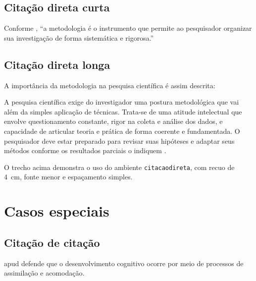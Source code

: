 \documentclass[a4paper, 12pt]{report}
\begin{document}
\section{Citação direta curta}

Conforme \textcite[p.~23]{severino2007}, ``a metodologia é o instrumento que
permite ao pesquisador organizar sua investigação de forma sistemática e
rigorosa.''

\section{Citação direta longa}

A importância da metodologia na pesquisa científica é assim descrita:

\begin{citacaodireta}
A pesquisa científica exige do investigador uma postura metodológica que vai
além da simples aplicação de técnicas. Trata-se de uma atitude intelectual
que envolve questionamento constante, rigor na coleta e análise dos dados,
e capacidade de articular teoria e prática de forma coerente e fundamentada.
O pesquisador deve estar preparado para revisar suas hipóteses e adaptar
seus métodos conforme os resultados parciais o indiquem
\parencite[p.~45--46]{severino2007}.
\end{citacaodireta}

O trecho acima demonstra o uso do ambiente \texttt{citacaodireta}, com recuo
de 4~cm, fonte menor e espaçamento simples.

\chapter{Casos especiais}

\section{Citação de citação}

\textcite{piaget1975} apud \textcite{moreira2011} defende que o
desenvolvimento cognitivo ocorre por meio de processos de assimilação e
acomodação.

\end{document}
